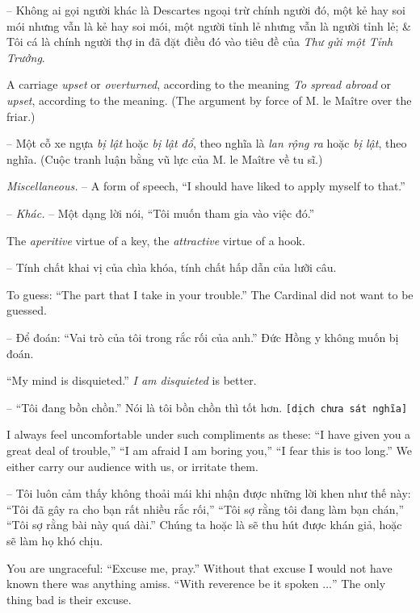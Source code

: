\documentclass{article}
\begin{document}
\begin{enumerate}
\begin{itemize}
		-- Không ai gọi người khác là Descartes ngoại trừ chính người đó, một kẻ hay soi mói nhưng vẫn là kẻ hay soi mói, một người tỉnh lẻ nhưng vẫn là người tỉnh lẻ; \& Tôi cá là chính người thợ in đã đặt điều đó vào tiêu đề của {\it Thư gửi một Tỉnh Trưởng}.
		
		 A carriage {\it upset} or {\it overturned}, according to the meaning {\it To spread abroad} or {\it upset}, according to the meaning. (The argument by force of M. le Ma\^itre over the friar.)
		
		-- Một cỗ xe ngựa {\it bị lật} hoặc {\it bị lật đổ}, theo nghĩa là {\it lan rộng ra} hoặc {\it bị lật}, theo nghĩa. (Cuộc tranh luận bằng vũ lực của M. le Ma\^itre về tu sĩ.)
		
		 {\it Miscellaneous.} -- A form of speech, ``I should have liked to apply myself to that.''
		
		-- {\it Khác.} -- Một dạng lời nói, ``Tôi muốn tham gia vào việc đó.''
		
		 The {\it aperitive} virtue of a key, the {\it attractive} virtue of a hook.
		
		-- Tính chất khai vị của chìa khóa, tính chất hấp dẫn của lưỡi câu.
		
		 To guess: ``The part that I take in your trouble.'' The Cardinal did not want to be guessed.
		
		-- Để đoán: ``Vai trò của tôi trong rắc rối của anh.'' Đức Hồng y không muốn bị đoán.
		
		``My mind is disquieted.'' {\it I am disquieted} is better.
		
		-- ``Tôi đang bồn chồn.'' Nói là tôi bồn chồn thì tốt hơn. {\tt[dịch chưa sát nghĩa]}
		
		 I always feel uncomfortable under such compliments as these: ``I have given you a great deal of trouble,'' ``I am afraid I am boring you,'' ``I fear this is too long.'' We either carry our audience with us, or irritate them.
		
		-- Tôi luôn cảm thấy không thoải mái khi nhận được những lời khen như thế này: ``Tôi đã gây ra cho bạn rất nhiều rắc rối,'' ``Tôi sợ rằng tôi đang làm bạn chán,'' ``Tôi sợ rằng bài này quá dài.'' Chúng ta hoặc là sẽ thu hút được khán giả, hoặc sẽ làm họ khó chịu.
		
		 You are ungraceful: ``Excuse me, pray.'' Without that excuse I would not have known there was anything amiss. ``With reverence be it spoken $\ldots$'' The only thing bad is their excuse.
		

\end{itemize}
\end{enumerate}
\end{document}
